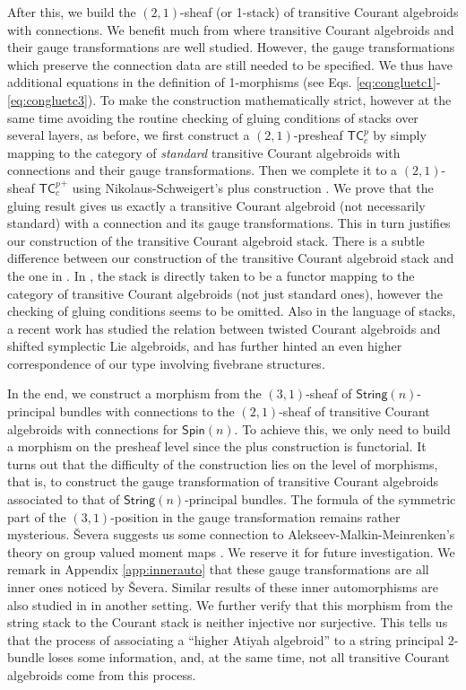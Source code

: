 \documentclass[letterpaper,10pt, oneside]{article} %
\newcommand{\tcalgdp}{{\mathsf{TC}^{p}_{c}}} %
\newcommand{\tcalgdpp}{{\mathsf{TC}^{p}_{c}}^+} %
\newcommand{\String}{\mathsf{String}}%
\newcommand{\Spin}{\mathsf{Spin}}%
\begin{document}
After this, we build the $(2,1)$-sheaf (or 1-stack) of transitive Courant algebroids with connections. We benefit much from \cite{ChenRCA} where transitive Courant algebroids and their gauge transformations are well studied.  However, the  gauge transformations which preserve the connection data are still needed to be specified. We thus have additional equations in the definition of 1-morphisms (see Eqs. \eqref{eq:congluetc1}-\eqref{eq:congluetc3}). To make the construction mathematically strict, however at the same time avoiding the routine checking of gluing conditions of stacks over several layers, as before, we first   construct   a $(2,1)$-presheaf $\tcalgdp$ by simply mapping to the category of {\em standard}  transitive Courant algebroids  with connections and their gauge transformations. Then we complete it to a $(2,1)$-sheaf $\tcalgdpp$ using Nikolaus-Schweigert's plus construction \cite{nikolaus-schweigert}.  We prove that the gluing result gives us exactly a transitive Courant algebroid (not necessarily standard) with a connection and its gauge transformations. This in turn justifies our construction of the transitive Courant algebroid stack. There is a subtle difference between our construction  of the transitive Courant algebroid stack and the one in \cite{Bressler:Pclass}. In \cite{Bressler:Pclass}, the stack is directly taken to be a functor mapping to the category of transitive Courant algebroids (not just standard ones), however the checking of gluing conditions seems to be omitted. Also in the  language of stacks,  a recent work \cite{Pym} has studied the relation between twisted Courant algebroids and shifted symplectic Lie algebroids, and has further hinted an even higher correspondence of our type involving fivebrane structures.



In the end, we construct a morphism from the $(3,1)$-sheaf of $\String(n)$-principal bundles with connections to the $(2,1)$-sheaf of transitive Courant algebroids with connections for $\Spin(n)$. To achieve this, we only need to build a morphism on the presheaf level since the plus construction is functorial. It turns out that the difficulty of the construction lies on the level of morphisms, that is, to construct the gauge transformation of transitive Courant algebroids associated to that of $\String(n)$-principal bundles. The formula of the symmetric part of the $(3,1)$-position in the gauge transformation remains rather mysterious. \v{S}evera suggests  us  some connection to Alekseev-Malkin-Meinrenken's theory on group valued moment maps \cite{AMM}. We reserve it for future investigation. We remark in Appendix  \ref{app:innerauto} that these gauge transformations are all inner ones noticed by \v{S}evera. Similar results of these inner automorphisms are also studied in \cite{GRT} in another setting.  We further verify that this morphism from the string stack to the Courant stack is neither injective nor surjective. This tells us that the process of associating a ``higher Atiyah algebroid'' to a string principal 2-bundle loses some information, and, at the same time, not all transitive Courant algebroids come from this process.
\end{document}
